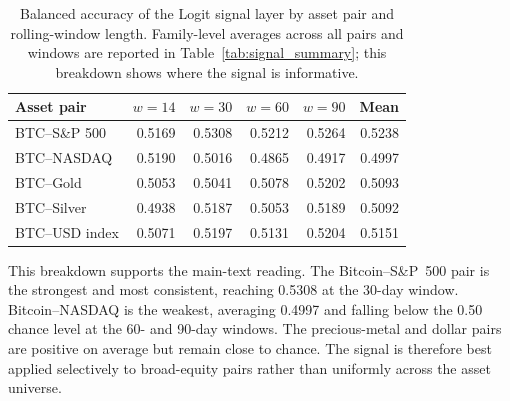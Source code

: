 \begin{table}[H]
    \centering
    \caption{Balanced accuracy of the Logit signal layer by asset pair and rolling-window
             length. Family-level averages across all pairs and windows are reported in
             Table~\ref{tab:signal_summary}; this breakdown shows where the signal is
             informative.}
    \label{tab:app_signal_summary}
    \begin{tabular}{lrrrrr}
        \toprule
        Asset pair & $w{=}14$ & $w{=}30$ & $w{=}60$ & $w{=}90$ & Mean \\
        \midrule
        BTC--S\&P 500  & 0.5169 & 0.5308 & 0.5212 & 0.5264 & 0.5238 \\
        BTC--NASDAQ    & 0.5190 & 0.5016 & 0.4865 & 0.4917 & 0.4997 \\
        BTC--Gold      & 0.5053 & 0.5041 & 0.5078 & 0.5202 & 0.5093 \\
        BTC--Silver    & 0.4938 & 0.5187 & 0.5053 & 0.5189 & 0.5092 \\
        BTC--USD index & 0.5071 & 0.5197 & 0.5131 & 0.5204 & 0.5151 \\
        \bottomrule
    \end{tabular}
\end{table}

This breakdown supports the main-text reading. The Bitcoin--S\&P~500 pair is the strongest and most consistent, reaching 0.5308 at the 30-day window. Bitcoin--NASDAQ is the weakest, averaging 0.4997 and falling below the 0.50 chance level at the 60- and 90-day windows. The precious-metal and dollar pairs are positive on average but remain close to chance. The signal is therefore best applied selectively to broad-equity pairs rather than uniformly across the asset universe.
